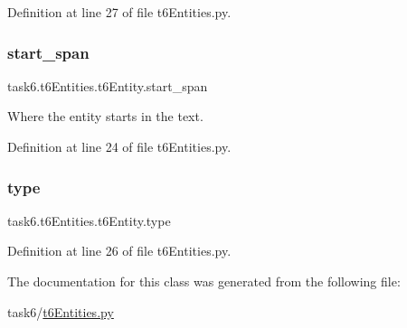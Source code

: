 Definition at line 27 of file t6\+Entities.\+py.

\mbox{\label{classtask6_1_1t6Entities_1_1t6Entity_a8221c36d2995a24200cdfbd74cc9233c}} 
\subsubsection{\texorpdfstring{start\+\_\+span}{start\_span}}
{\footnotesize\ttfamily task6.\+t6\+Entities.\+t6\+Entity.\+start\+\_\+span}



Where the entity starts in the text. 



Definition at line 24 of file t6\+Entities.\+py.

\mbox{\label{classtask6_1_1t6Entities_1_1t6Entity_af0496eb852234bb168ab22d031c99ed3}} 
\subsubsection{\texorpdfstring{type}{type}}
{\footnotesize\ttfamily task6.\+t6\+Entities.\+t6\+Entity.\+type}



Definition at line 26 of file t6\+Entities.\+py.



The documentation for this class was generated from the following file\+:\begin{DoxyCompactItemize}
\item 
task6/\hyperlink{t6Entities_8py}{t6\+Entities.\+py}\end{DoxyCompactItemize}
